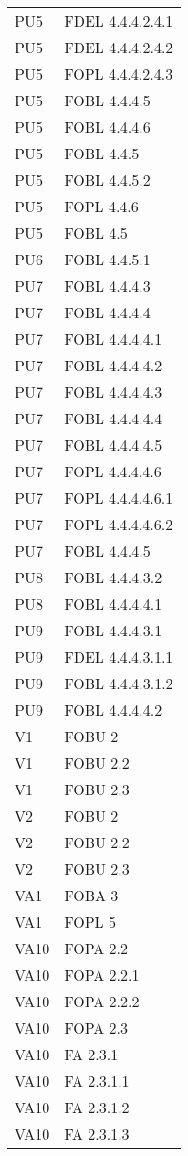 \begin{longtable}{XX}
PU5&FDEL 4.4.4.2.4.1\\ 
PU5&FDEL 4.4.4.2.4.2\\ 
PU5&FOPL 4.4.4.2.4.3\\ 
PU5&FOBL 4.4.4.5\\ 
PU5&FOBL 4.4.4.6\\ 
PU5&FOBL 4.4.5\\ 
PU5&FOBL 4.4.5.2\\ 
PU5&FOPL 4.4.6\\ 
PU5&FOBL 4.5\\ 
\midrule 
PU6&FOBL 4.4.5.1\\ 
\midrule 
PU7&FOBL 4.4.4.3\\ 
PU7&FOBL 4.4.4.4\\ 
PU7&FOBL 4.4.4.4.1\\ 
PU7&FOBL 4.4.4.4.2\\ 
PU7&FOBL 4.4.4.4.3\\ 
PU7&FOBL 4.4.4.4.4\\ 
PU7&FOBL 4.4.4.4.5\\ 
PU7&FOPL 4.4.4.4.6\\ 
PU7&FOPL 4.4.4.4.6.1\\ 
PU7&FOPL 4.4.4.4.6.2\\ 
PU7&FOBL 4.4.4.5\\ 
\midrule 
PU8&FOBL 4.4.4.3.2\\ 
PU8&FOBL 4.4.4.4.1\\ 
\midrule 
PU9&FOBL 4.4.4.3.1\\ 
PU9&FDEL 4.4.4.3.1.1\\ 
PU9&FOBL 4.4.4.3.1.2\\ 
PU9&FOBL 4.4.4.4.2\\ 
\midrule 
V1&FOBU 2\\ 
V1&FOBU 2.2\\ 
V1&FOBU 2.3\\ 
\midrule 
V2&FOBU 2\\ 
V2&FOBU 2.2\\ 
V2&FOBU 2.3\\ 
\midrule 
VA1&FOBA 3\\ 
VA1&FOPL 5\\ 
\midrule 
VA10&FOPA 2.2\\ 
VA10&FOPA 2.2.1\\ 
VA10&FOPA 2.2.2\\ 
VA10&FOPA 2.3\\ 
VA10&FA 2.3.1\\ 
VA10&FA 2.3.1.1\\ 
VA10&FA 2.3.1.2\\ 
VA10&FA 2.3.1.3\\ 

\end{longtable}
